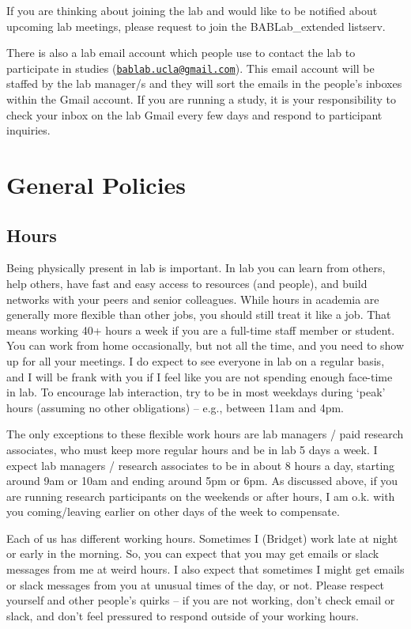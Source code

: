 \documentclass[]{book}
\begin{document}
If you are thinking about joining the lab and would like to be notified about upcoming lab meetings, please request to join the BABLab\_extended listserv.

There is also a lab email account which people use to contact the lab to participate in studies (\href{mailto:bablab.ucla@gmail.com}{\nolinkurl{bablab.ucla@gmail.com}}). This email account will be staffed by the lab manager/s and they will sort the emails in the people's inboxes within the Gmail account. If you are running a study, it is your responsibility to check your inbox on the lab Gmail every few days and respond to participant inquiries.

\hypertarget{general-policies}{%
\chapter{General Policies}\label{general-policies}}

\hypertarget{hours}{%
\section{Hours}\label{hours}}

Being physically present in lab is important. In lab you can learn from others, help others, have fast and easy access to resources (and people), and build networks with your peers and senior colleagues. While hours in academia are generally more flexible than other jobs, you should still treat it like a job. That means working 40+ hours a week if you are a full-time staff member or student. You can work from home occasionally, but not all the time, and you need to show up for all your meetings. I do expect to see everyone in lab on a regular basis, and I will be frank with you if I feel like you are not spending enough face-time in lab. To encourage lab interaction, try to be in most weekdays during `peak' hours (assuming no other obligations) -- e.g., between 11am and 4pm.

The only exceptions to these flexible work hours are lab managers / paid research associates, who must keep more regular hours and be in lab 5 days a week. I expect lab managers / research associates to be in about 8 hours a day, starting around 9am or 10am and ending around 5pm or 6pm. As discussed above, if you are running research participants on the weekends or after hours, I am o.k. with you coming/leaving earlier on other days of the week to compensate.

Each of us has different working hours. Sometimes I (Bridget) work late at night or early in the morning. So, you can expect that you may get emails or slack messages from me at weird hours. I also expect that sometimes I might get emails or slack messages from you at unusual times of the day, or not. Please respect yourself and other people's quirks -- if you are not working, don't check email or slack, and don't feel pressured to respond outside of your working hours.
\end{document}
